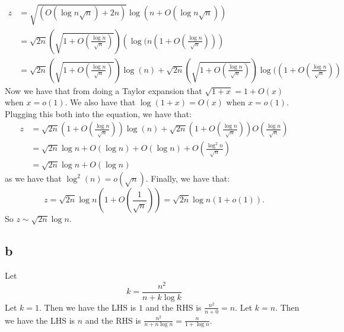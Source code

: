 \documentclass[]{article}
\begin{document}
\begin{align*}
	z &= \sqrt{(O(\log n \sqrt{n}) + 2n)}\log(n + O(\log n \sqrt n))\\
	&= \sqrt{2n} \left(\sqrt{1 + O(\frac{\log n}{\sqrt{n}})}\right) \left(\log( n(1 + O(\frac{\log n}{\sqrt{n}} )) \right)\\
	&= \sqrt{2n}\left(\sqrt{1 + O(\frac{\log n}{\sqrt{n}})}\right) \log(n) + \sqrt{2n}\left(\sqrt{1 + O(\frac{\log n}{\sqrt{n}})}\right) \log((1 + O(\frac{\log n}{\sqrt{n}}))
	\end{align*}
Now we have that from doing a Taylor expansion that $\sqrt{1 + x} = 1 + O(x)$ when $x = o(1)$. We also have that $\log(1 + x) = O(x)$ when $x = o(1)$. Plugging this both into the equation, we have that:
\begin{align*}
	z &= \sqrt{2n}(1 + O(\frac{\log n}{\sqrt{n}})) \log(n) + \sqrt{2n}(1 + O(\frac{\log n}{\sqrt{n}}))O(\frac{\log n}{\sqrt{n}})\\
	&= \sqrt{2n} \log n + O(\log n) + O(\log n) + O(\frac{\log^2 n}{\sqrt{n}})\\
	&= \sqrt{2n} \log n + O(\log n)
\end{align*}
as we have that $\log^2(n) = o(\sqrt{n})$. Finally, we have that:
\begin{equation}
	z = \sqrt{2n} \log n ( 1 + O(\frac{1}{\sqrt{n}})) = \sqrt{2n} \log n (1 + o(1)).
\end{equation}
So $z \sim \sqrt{2n} \log n$.

\subsection{b}
Let
\begin{equation}
	k = \frac{n^2}{n + k \log k}
\end{equation}
Let $k = 1$. Then we have the LHS is $1$ and the RHS is $\frac{n^2}{n + 0} = n$. Let $k = n$. Then we have the LHS is $n$ and the RHS is $\frac{n^2}{n + n \log n} = \frac{n}{1 + \log n}$.
\end{document}
